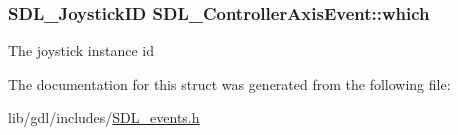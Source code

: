 \subsubsection[{which}]{\setlength{\rightskip}{0pt plus 5cm}S\+D\+L\+\_\+\+Joystick\+I\+D S\+D\+L\+\_\+\+Controller\+Axis\+Event\+::which}\label{struct_s_d_l___controller_axis_event_a07087f68ea9d64b50047d65312ee7b94}
The joystick instance id 

The documentation for this struct was generated from the following file\+:\begin{DoxyCompactItemize}
\item 
lib/gdl/includes/\hyperlink{_s_d_l__events_8h}{S\+D\+L\+\_\+events.\+h}\end{DoxyCompactItemize}
